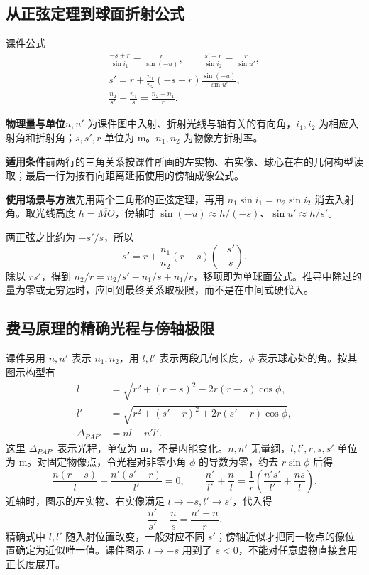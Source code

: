 \documentclass[UTF8,fontset=none,zihao=-4,a4paper]{ctexart}
\newcommand{\explain}[3]{\par\noindent\textbf{物理量与单位}\quad #1\par
\noindent\textbf{适用条件}\quad #2\par
\noindent\textbf{使用场景与方法}\quad #3\par}
\begin{document}
\subsection{从正弦定理到球面折射公式}
\begin{infobox}{课件公式}
\begin{gather*}
 \frac{-s+r}{\sin i_1}=\frac r{\sin(-u)},\qquad
 \frac{s'-r}{\sin i_2}=\frac r{\sin u'},\\
 s'=r+\frac{n_1}{n_2}(-s+r)\frac{\sin(-u)}{\sin u'},\\
 \frac{n_2}{s'}-\frac{n_1}{s}=\frac{n_2-n_1}{r}.
\end{gather*}
\end{infobox}
\explain{$u,u'$ 为课件图中入射、折射光线与轴有关的有向角，$i_1,i_2$ 为相应入射角和折射角；$s,s',r$ 单位为 m。$n_1,n_2$ 为物像方折射率。}{前两行的三角关系按课件所画的左实物、右实像、球心在右的几何构型读取；最后一行为按有向距离延拓使用的傍轴成像公式。}{先用两个三角形的正弦定理，再用 $n_1\sin i_1=n_2\sin i_2$ 消去入射角。取光线高度 $h=\overline{MO}$，傍轴时 $\sin(-u)\approx h/(-s)$、$\sin u'\approx h/s'$。}
两正弦之比约为 $-s'/s$，所以
\[
 s'=r+\frac{n_1}{n_2}(r-s)\left(-\frac{s'}s\right).
\]
除以 $rs'$，得到 $n_2/r=n_2/s'-n_1/s+n_1/r$，移项即为单球面公式。推导中除过的量为零或无穷远时，应回到最终关系取极限，而不是在中间式硬代入。

\subsection{费马原理的精确光程与傍轴极限}
课件另用 $n,n'$ 表示 $n_1,n_2$，用 $l,l'$ 表示两段几何长度，$\phi$ 表示球心处的角。按其图示构型有
\begin{equation*}\begin{aligned}
 l&=\sqrt{r^2+(r-s)^2-2r(r-s)\cos\phi},\\
 l'&=\sqrt{r^2+(s'-r)^2+2r(s'-r)\cos\phi},\\
 \Delta_{PAP'}&=nl+n'l'.
\end{aligned}\end{equation*}
这里 $\Delta_{PAP'}$ 表示光程，单位为 m，不是内能变化。$n,n'$ 无量纲，$l,l',r,s,s'$ 单位为 m。对固定物像点，令光程对非零小角 $\phi$ 的导数为零，约去 $r\sin\phi$ 后得
\[
 \frac{n(r-s)}l-\frac{n'(s'-r)}{l'}=0,
 \qquad
 \frac{n'}{l'}+\frac nl=\frac1r\left(\frac{n's'}{l'}+\frac{ns}l\right).
\]
近轴时，图示的左实物、右实像满足 $l\to-s,l'\to s'$，代入得
\[
 \frac{n'}{s'}-\frac ns=\frac{n'-n}r.
\]
精确式中 $l,l'$ 随入射位置改变，一般对应不同 $s'$；傍轴近似才把同一物点的像位置确定为近似唯一值。课件图示 $l\to-s$ 用到了 $s<0$，不能对任意虚物直接套用正长度展开。
\end{document}
